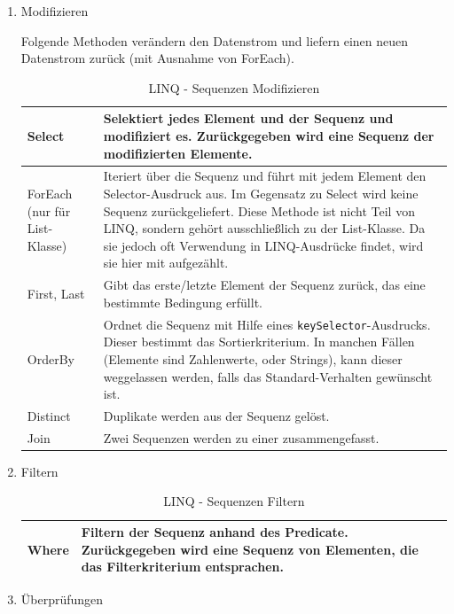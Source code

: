 \begin{enumerate}
\item Modifizieren

Folgende Methoden verändern den Datenstrom und liefern einen neuen Datenstrom
zurück (mit Ausnahme von ForEach).


\begin{table}[H]
	\centering
\begin{tabularx}{\textwidth}{|p{130 pt}|X|}
		\hline
Select & Selektiert jedes Element und der Sequenz und modifiziert es. Zurückgegeben wird eine Sequenz der modifizierten Elemente.\\	\hline
ForEach (nur für List-Klasse) & Iteriert über die Sequenz und führt mit jedem Element den Selector-Ausdruck aus. Im Gegensatz zu Select wird keine Sequenz zurückgeliefert. Diese Methode ist nicht Teil von LINQ, sondern gehört ausschließlich zu der List-Klasse. Da sie jedoch oft Verwendung in LINQ-Ausdrücke findet, wird sie hier mit aufgezählt.\\	\hline
First,  Last & Gibt das erste/letzte Element der Sequenz zurück, das eine bestimmte Bedingung erfüllt.\\	\hline
OrderBy & Ordnet die Sequenz mit Hilfe eines \texttt{keySelector}-Ausdrucks. Dieser bestimmt das Sortierkriterium. In manchen Fällen (Elemente sind Zahlenwerte, oder Strings), kann dieser weggelassen werden, falls das Standard-Verhalten gewünscht ist.\\	\hline
Distinct & Duplikate werden aus der Sequenz gelöst.\\	\hline
Join & Zwei Sequenzen werden zu einer zusammengefasst.\\	\hline
\end{tabularx}
	\medskip
	\caption{LINQ - Sequenzen Modifizieren}
\end{table}


\item Filtern

\bigskip

\begin{table}[H]
	\centering
\begin{tabularx}{\textwidth}{|p{130 pt}|X|}
		\hline
Where & Filtern der Sequenz anhand des Predicate. Zurückgegeben wird eine Sequenz von Elementen, die das Filterkriterium entsprachen.\\	\hline
\end{tabularx}
	\medskip
	\caption{LINQ - Sequenzen Filtern}
\end{table}

\item Überprüfungen


\end{enumerate}
